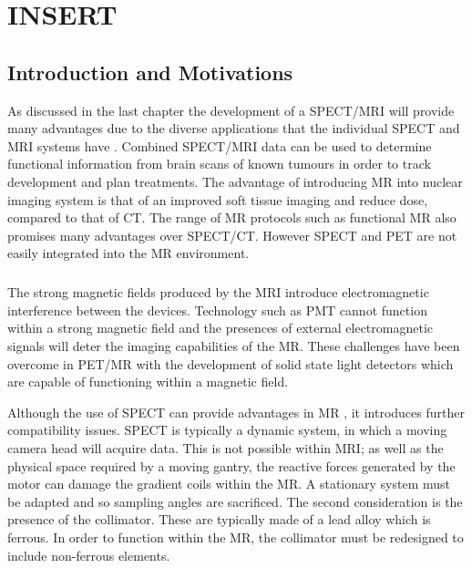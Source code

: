 \chapter{INSERT}
\label{LitRev}

\section{Introduction and Motivations}
As discussed in the last chapter the development of a \acrshort{SPECT/MRI} will provide many advantages due to the diverse applications that the individual \acrshort{SPECT} and \acrshort{MRI} systems have \cite{doi:10.1259/bjr.20160690}. Combined \acrshort{SPECT/MRI} data can be used to determine functional information from brain scans of known tumours in order to track development and plan treatments. The advantage of introducing \acrshort{MR} into nuclear imaging system is that of an improved soft tissue imaging and reduce dose, compared to that of \acrshort{CT}. The range of \acrshort{MR} protocols such as functional \acrshort{MR} also promises many advantages over \acrshort{SPECT/CT}. However \acrshort{SPECT} and \acrshort{PET} are not easily integrated into the \acrshort{MR} environment. 
\paragraph{}
The strong magnetic fields produced by the \acrshort{MRI} introduce electromagnetic interference between the devices. Technology such as \acrshort{PMT} cannot function within a strong magnetic field and the presences of external electromagnetic signals will deter the imaging capabilities of the \acrshort{MR}. These challenges have been overcome in \acrshort{PET/MR} with the development of solid state light detectors which are capable of functioning within a magnetic field.

Although the use of \acrshort{SPECT} can provide advantages in \acrshort{MR} \cite{doi:10.1177/153303460600500406}, it introduces further compatibility issues. \acrshort{SPECT} is typically a dynamic system, in which a moving camera head will acquire data. This is not possible within \acrshort{MRI}; as well as the physical space required by a moving gantry, the reactive forces generated by the motor can damage the gradient coils within the \acrshort{MR}. A stationary system must be adapted and so sampling angles are sacrificed. The second consideration is the presence of the collimator. These are typically made of a lead alloy which is ferrous. In order to function within the \acrshort{MR}, the collimator must be redesigned to include non-ferrous elements. 
